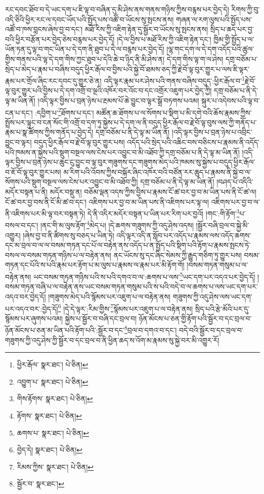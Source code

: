 རང་དབང་ཐོབ་བ་དེ་ཡང་དག་པ་ཇི་ལྟ་བ་བཞིན་དུ་མི་ཤེས་ནས་གནས་གཉིས་ཀྱིས་བརྙས་པར་བྱེད་དེ། རིགས་ཀྱི་བུ་འདི་ཅིའི་ཕྱིར་རང་ལ་དབང་ཡོད་པའི་སྤྱོད་པས་འཚོ་བ་ཡོངས་སུ་སྤངས་ནས། གཞན་ལ་རག་ལུས་པའི་སྤྱོད་པས་འཚོ་བ་ཁས་བླངས་ཞེས་བྱ་བ་དང་། མཐོ་རིས་ཀྱི་འཇིག་རྟེན་དུ་སྦྱོར་བ་ཡོངས་སུ་སྤངས་ནས། སྲིད་པ་ཆད་པར་བྱ་བའི་ཕྱིར་བརྩོན་པར་བྱེད་ཅེས་བརྙས་པར་བྱེད་དོ། །དེ་ལ་བྱིས་པ་མཐོ་རིས་ཀྱི་འཇིག་རྟེན་དང་། ཁྱིམ་གྱི་སྤྱོད་པ་ལ་ཡོན་ཏན་དུ་ལྟ་བ་གང་ཡིན་པ་དེ་དག་ནི་ཐུབ་པ་དེ་ལ་བརྙས་པར་བྱེད་དོ། །ལྷ་གང་དག་ལ་དེ་དག་འདོད་པའི་ཚུལ་གྱིས་གནས་པའི་ལྷ་དེ་དག་གིས་ཀྱང་ཐུབ་པ་དེའི་ཆེ་བ་ཉིད་ནི་མི་ཤེས་ན། དེ་དག་གིས་ལྟ་ག་ལ་ཤེས། དགྲ་བཅོམ་པ་སྲེད་པ་མེད་པ་རྣམ་པ་བཞིས་བདུད་ཕྱིར་རྒོལ་བ་བྱིས་པའི་སྐྱེ་བོ་ཐམས་ཅད་ཀྱི་རྗེ་བོ་ལྟ་བུར་གྱུར་པ་ལས་ཇི་ལྟར་རྣམ་པར་གྲོལ་ཞིང་རང་དབང་དུ་གྱུར་ཅེ་ན། འདི་ལྟར་རྣམ་པར་ཤེས་པའི་གནས་བཞིས་བདུད་:ཕྱིར་རྒོལ་བ་\footnote{ཕྱིར་རྒོལ་  སྣར་ཐང་།  པེ་ཅིན། }རྗེ་བོ་ལྟ་བུར་གྱུར་པའི་བྱིས་པ་དེ་དག་འགྲོ་བ་ལྔའི་འཁོར་བར་འོང་བ་དང་འགྲོར་འཇུག་པར་བྱེད་ཀྱི། དགྲ་བཅོམ་པ་ནི་དེ་ལྟ་མ་ཡིན་ནོ། །འདི་ལྟར་བྱིས་པ་བྲན་ཉེས་པ་རྔམས་པོ་ཆེ་བྱུང་བ་ལྟར་སྒྲོ་བཏགས་པའམ། སྐུར་པ་འདེབས་པའི་ལྟ་བ་ངན་པ་དང་། :དབྱིག་པ་\footnote{འབྱུག་པ་  སྣར་ཐང་།  པེ་ཅིན། }ཐོགས་པ་དང་། མཚོན་ཆ་ཐོགས་པ་ལ་སོགས་པ་སྡིག་པ་མི་དགེ་བའི་ཆོས་རྣམས་ཀྱིས་སྤྲོས་པར་ལྟུང་བ་ངན་སོང་གི་འགྲོ་བ་དག་ཏུ་སྐྱེས་པ་དེ་དག་ལ་ནི་བདུད་ཕྱིར་རྒོལ་བ་རྗེ་བོ་ལྟ་བུས་ལས་ཀྱི་གནོད་པ་རྣམ་པ་སྣ་ཚོགས་ཀྱིས་གནོད་པ་བྱེད་དེ། དགྲ་བཅོམ་པ་ནི་དེ་ལྟ་མ་ཡིན་ནོ། །འདི་ལྟར་བྱིས་པ་བྲན་ཉེས་པ་འབྲིང་བྱུང་བ་ལྟར། བདུད་ཕྱིར་རྒོལ་བ་རྗེ་བོ་ལྟ་བུར་གྱུར་པས། འདོད་པའི་སྲེད་པའི་འཆིང་བས་བཅིངས་པ་རྣམས་ནི་འདོད་པའི་ཁམས་ན་སྐྱེས་པའི་སྡུག་བསྔལ་ལས་ངེས་པར་འབྱུང་བ་མི་འཐོབ་ཀྱི་དགྲ་བཅོམ་པ་ནི་དེ་ལྟ་མ་ཡིན་ནོ། །འདི་ལྟར་བྱིས་པ་བྲན་ཉེས་པ་ཆུང་ངུ་བྱུང་བ་ལྟ་བུར་གཟུགས་དང་གཟུགས་མེད་པའི་ཁམས་སུ་སྐྱེས་པ་བདུད་ཕྱིར་རྒོལ་བ་ཇོ་བོ་ལྟ་བུར་གྱུར་པས། མ་རིག་པའི་འོབས་ཀྱིས་བསྐོར་ཞིང་འཁོར་བའི་བཙོན་རར་ཆུད་པ་རྣམས་ནི་སྐྱེ་བ་ལ་སོགས་པའི་སྡུག་བསྔལ་ལས་ངེས་པར་འབྱུང་བ་མི་འཐོབ་ཀྱི། དགྲ་བཅོམ་པ་ནི་དེ་ལྟ་མ་ཡིན་ནོ། །བཤད་པ་འདིའི་མདོར་བསྟན་པ་ནི། མདོར་བསྡུ་ན། བཅོམ་ལྡན་འདས་ཀྱིས་བྱིས་པ་རྣམས་ངོ་ཚ་བར་བྱ་བ་མ་ཡིན་པས་ནི་ངོ་ཚ་ལ། ངོ་ཚ་བར་བྱ་བས་ནི་ངོ་མི་ཚ་བ་དང་། འཇིགས་པར་བྱ་བ་མ་ཡིན་པས་ནི་འཇིགས་པར་ལྟ་ལ། འཇིགས་པར་བྱ་བ་ལ་ནི་འཇིགས་པར་མི་ལྟ་བར་བསྟན་ཏེ། དེ་ནི་འདིར་མདོར་བསྟན་པ་ཡིན་པར་རིག་པར་བྱའོ། །གང་:གི་རྟོག་\footnote{གིས་རྟོགས་  སྣར་ཐང་།  པེ་ཅིན། }པ་བསལ་བ་དང་། །ནང་གི་མ་ལུས་རྟོག་\footnote{རྟོགས་  སྣར་ཐང་།  པེ་ཅིན། }མེད་པ། །དེ་ཆགས་གཟུགས་ཀྱི་འདུ་ཤེས་འདས། །སྦྱོར་བཞི་བྲལ་བ་སྐྱེ་མི་འགྱུར། །ཞེས་བྱ་བ་ནི་ཚིགས་སུ་བཅད་པ་ཡིན་ཏེ། འདི་ལྟར་འདི་ན་སློབ་པར་འདོད་པ་རྣམས་ལས་འདོད་ཆགས་དང་མ་བྲལ་བ་ལ་ལ་བསམ་གཏན་དང་པོ་ལ་བརྟེན་ནས་འདོད་པ་ན་སྤྱོད་པའི་སྡིག་པའི་རྟོག་པ་རྣམས་སྤངས་ཏེ་བསལ་ལ་བསམ་གཏན་གཉིས་པ་ལ་བརྟེན་ནས། ནང་ཡོངས་སུ་དང་ཞིང་སེམས་ཀྱི་རྒྱུད་གཅིག་ཏུ་གྱུར་པས། བསམ་གཏན་དང་པོའི་ས་པའི་རྣམ་པར་རྟོག་པ་མ་ལུས་པ་རྣམས་ལ་རྣམ་པར་མི་རྟོག་གོ། །བསམ་གཏན་གསུམ་པ་ལ་བརྟེན་ནས། ཡང་བསམ་གཏན་གཉིས་པའི་ས་པའི་དགའ་བ་ལ་:ཆགས་པ་ལས་\footnote{ཆགས་པ་  སྣར་ཐང་།  པེ་ཅིན། }ཡང་དག་པར་འདའ་པར་བྱེད་དོ། །བསམ་གཏན་བཞི་པ་ལ་བརྟེན་ནས་ཡང་བསམ་གཏན་གསུམ་པའི་ས་པའི་བདེ་བ་ལ་ཆགས་པ་ལས་ཡང་དག་པར་འདའ་བར་བྱེད་དོ། །གཟུགས་མེད་པའི་སྙོམས་པར་འཇུག་པ་ལ་བརྟེན་ནས། གཟུགས་ཀྱི་འདུ་ཤེས་ལས་ཡང་དག་པར་འདའ་བར་:བྱེད་དོ།\footnote{བྱེད་དེ།  སྣར་ཐང་།  པེ་ཅིན། } །དེ་དེ་ལྟར་:རིམ་གྱིས་\footnote{རིམས་ཀྱིས་  སྣར་ཐང་།  པེ་ཅིན། }སྙོམས་པར་འཇུག་པ་ལ་བརྟེན་ནས། སྲིད་པའི་རྩེ་མོའི་པར་དུ་སྙོམས་པར་ཞུགས་པའམ། སྐྱེས་པ་སྦྱོར་བ་བཞི་དང་བྲལ་བ། ཉོན་མོངས་པ་ཅན་གྱི་རྟོག་པའི་སྦྱོར་བ་དང་བྲལ་བ་ཉོན་མོངས་པ་ཅན་མ་ཡིན་པའི་རྟོག་པའི་:སྦྱོར་བ་དང་\footnote{སྦྱོར་བ་  སྣར་ཐང་། }བྲལ་བ་དགའ་བ་དང་། བདེ་བའི་སྦྱོར་བ་དང་བྲལ་བ་གཟུགས་ཀྱི་འདུ་ཤེས་ཀྱི་སྦྱོར་བ་དང་བྲལ་བ་ནི་ཕྱིན་ཆད་ས་འོག་མ་རྣམས་སུ་སྐྱེ་བར་མི་འགྱུར་རོ། 